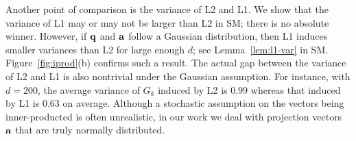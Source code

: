 Another point of comparison is the variance of L2 and L1.
We show that the variance of L1 may or may not be larger than L2 in SM; there is no absolute winner.
However, if ${{\mathbf q}}$ and $\mathbf{a}$ follow a Gaussian distribution, then L1 induces smaller variances than L2 for large enough $d$; see Lemma~\ref{lem:l1-var} in SM.
Figure~\ref{fig:iprod}(b) confirms such a result.
The actual gap between the variance of L2 and L1 is also nontrivial under the Gaussian assumption.
For instance, with $d=200$, the average variance of $G_k$ induced by L2 is 0.99 whereas that induced by L1 is 0.63 on average.
Although a stochastic assumption on the vectors being inner-producted is often unrealistic, in our work we deal with projection vectors $\mathbf{a}$ that are truly normally distributed.


